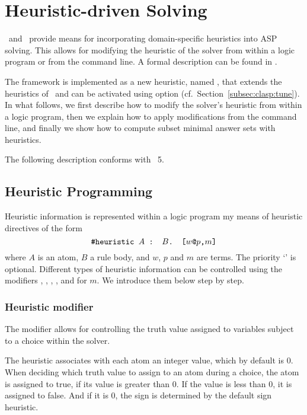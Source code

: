 
\section{Heuristic-driven Solving}
\label{sec:heuristic}
\clasp\ and \clingo\ provide means for incorporating domain-specific heuristics into ASP solving.
This allows for modifying the heuristic of the solver from within a logic program or from the command line.
A formal description can be found in \cite{gekaotroscwa13a}.

The framework is implemented as a new heuristic, named ,
that extends the  heuristics of \clasp\ 
and can be activated using option 
(cf.\ Section~\ref{subsec:clasp:tune}).
In what follows,
we first describe how to modify the solver's heuristic from within a logic program, 
then we explain how to apply modifications from the command line, 
and finally we show how to compute subset minimal answer sets with heuristics.

The following description conforms with \clingo~5.%

\subsection{Heuristic Programming}
Heuristic information is represented within a logic program my means of heuristic directives of the form
\[\texttt{\#heuristic }A\texttt{ : }B\texttt{. [}w\texttt{@}p\texttt{,}m\texttt{]}\]
where $A$ is an atom, $B$ a rule body, and $w$, $p$ and $m$ are terms.
%
The priority `' is optional.
%
Different types of heuristic information can be controlled using the modifiers 
\code{sign}, \code{level}, \code{true}, \code{false}, \code{init} and  for $m$.
We introduce them below step by step.

\subsubsection{Heuristic modifier }
The modifier \code{sign} allows for controlling the truth value assigned to variables subject to a choice within the solver.

The  heuristic associates with each atom an integer  value, which by default is $0$.
When deciding which truth value to assign to an atom during a choice, the atom is assigned to true, if its  value is greater than $0$. 
If the \code{sign} value is less than 0, it is assigned to false.
And if it is $0$, the sign is determined by the default sign heuristic.

